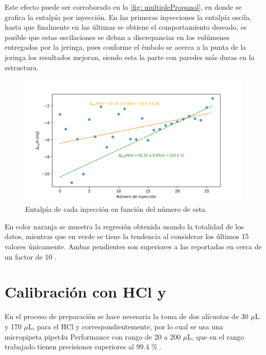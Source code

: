 		Este efecto puede ser corroborado en la \autoref{fig: multiplePropanol}, en donde se grafica la entalp\'ia por inyecci\'on. En las primeras inyecciones la entalp\'ia oscila, hasta que finalmente en las \'ultimas se obtiene el comportamiento deseado, es posible que estas oscilaciones se deban a discrepancias en los vol\'umenes entregados por la jeringa, pues conforme el \'embolo se acerca a la punta de la jeringa los resultados mejoran, siendo esta la parte con paredes m\'as duras en la estructura.
		\begin{figure}[h]
			\centering
			\includegraphics[width=\linewidth]{../Data/ChemicalCalibrations/multipleInt}
			\caption{Entalp\'ia de cada inyecci\'on en funci\'on del n\'umero de esta.}
			\label{fig: multiplePropanol}
		\end{figure}
	
		En color naranja se muestra la regresi\'on obtenida usando la totalidad de los datos, mientras que en verde se tiene la tendencia al considerar los \'ultimos 15 valores \'unicamente. Ambas pendientes son superiores a las reportadas en cerca de un factor de 10 \cite{demarse2011calibration, nanoitc}.
\section{Calibraci\'on con HCl y }\label{sec: soluciones}
	 En el proceso de preparaci\'on se hace necesaria la toma de dos al\'icuotas de 30 $\mu$L y 170 $\mu$L, para el HCl y  correspondientemente, por lo cual se usa una micropipeta pipet4u Performance con rango de 20 a 200 $\mu$L, que en el rango trabajado tienen precisiones superiores al 99.4 \% \cite{pipet4u}.
	
